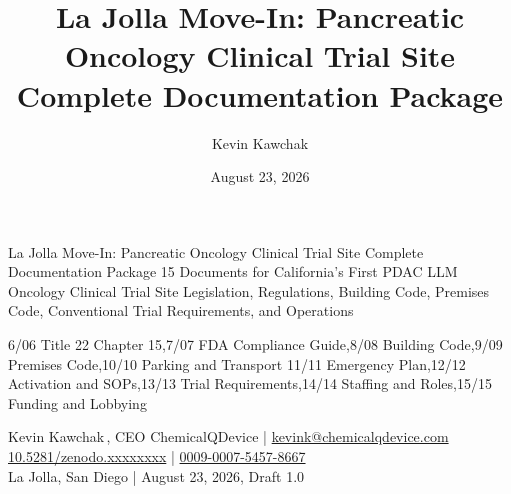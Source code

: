 \documentclass[11pt]{article}
\title{La Jolla Move-In: Pancreatic Oncology Clinical Trial Site Complete
Documentation Package}
\author{Kevin Kawchak}
\date{August 23, 2026}
\begin{document}
\thispagestyle{plain}

%
{La Jolla Move-In: Pancreatic Oncology Clinical Trial Site Complete
Documentation Package}%
{15 Documents for California's First PDAC LLM Oncology Clinical Trial Site}%
{Legislation, Regulations, Building Code, Premises Code, Conventional Trial
Requirements, and Operations}

\vspace{0.30em}

\begin{center}
 \enspace {} \enspace
{} \enspace {} \enspace
{}
\end{center}

\vspace{-0.30em}

%
{6/{06 Title 22 Chapter 15},7/{07 FDA Compliance Guide},8/{08 Building Code},9/{09 Premises Code},10/{10 Parking and Transport}}%
{11/{11 Emergency Plan},12/{12 Activation and SOPs},13/{13 Trial Requirements},14/{14 Staffing and Roles},15/{15 Funding and Lobbying}}

\vspace{-0.10em}
\mvrule{0.9pt}

\begin{center}\small
Kevin Kawchak\,, CEO ChemicalQDevice \;|\;
\href{mailto:kevink@chemicalqdevice.com}{kevink@chemicalqdevice.com}\\
\href{https://doi.org/10.5281/zenodo.xxxxxxxx}{10.5281/zenodo.xxxxxxxx} \;|\;
\href{https://orcid.org/0009-0007-5457-8667}{0009-0007-5457-8667}\\
La Jolla, San Diego \;|\; August 23, 2026, Draft 1.0
\end{center}
\end{document}
